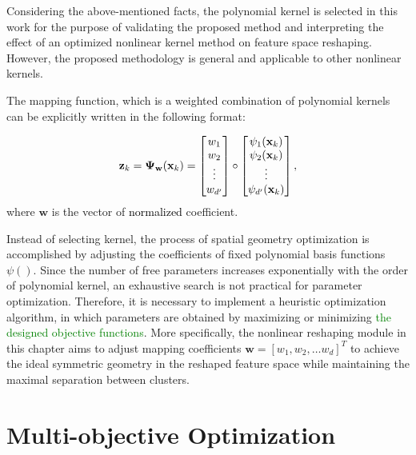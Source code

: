 Considering the above-mentioned facts, the polynomial kernel is selected in this work for the purpose of validating the proposed method and interpreting the effect of an optimized nonlinear kernel method on feature space reshaping. However, the proposed methodology is general and applicable to other nonlinear kernels.

The mapping function, which is a weighted combination of polynomial kernels can be explicitly written in the following format:

\begin{align}
\mathbf{z}_k
=\mathbf{\Psi_{w}} (\mathbf{x}_k) = 
\begin{bmatrix}
w_{1}  \\
w_{2}   \\
\vdots \\
w_{d^\prime} 
\end{bmatrix}
\circ
\begin{bmatrix}
\psi_1(\mathbf{x}_k)\\
\psi_2(\mathbf{x}_k)\\
\vdots\\
\psi_{d^\prime}(\mathbf{x}_k)
\end{bmatrix} \color{black}{,}
\label{eq:z}
\end{align}
where $\mathbf{w}$ is the vector of \textcolor{black}{normalized} coefficient.%

Instead of selecting kernel, %
the process of spatial geometry optimization is accomplished by adjusting the coefficients of fixed polynomial basis functions $\psi()$. Since the number of free parameters increases exponentially with the order of polynomial kernel, an exhaustive search is not practical for parameter optimization. Therefore, it is necessary to implement a heuristic optimization algorithm, in which parameters are obtained by maximizing or minimizing \textcolor{green}{the designed objective functions}. More specifically, the nonlinear reshaping module in this chapter aims to adjust mapping coefficients  $\mathbf{w} = [w_1,w_2,\dots w_d]^T$ to achieve the ideal symmetric geometry in the reshaped feature space while maintaining the maximal separation between clusters.


\section{Multi-objective Optimization}

